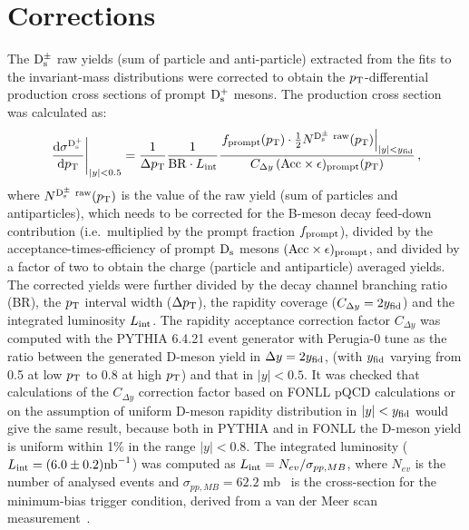 \section{Corrections}
\label{sec:corrPP}
The ${\rm D_s^{\pm}}$ raw yields (sum of particle and anti-particle) extracted from the fits to the invariant-mass distributions
were corrected to obtain the $p_{\rm T}$-differential production cross sections of prompt
 ${\rm D_s^+}$ mesons. The production cross section was calculated as:
\begin{equation}
  \label{eq:dsdptPP}
  \left.\frac{{\rm d} \sigma^{\rm D^{+}_{\rm s}}}{{\rm d}p_{\rm T}}\right|_{|y|<0.5}=
  \frac{1}{ \Delta p_{\rm T}}\frac{1}{{\rm BR} \cdot L_{\rm int}}\frac{\left.f_{\rm prompt}(p_{\rm T})\cdot \frac{1}{2} N^{\rm D^\pm_{\rm s}~raw}(p_{\rm T})\right|_{|y|<y_{\rm fid}}}{ C_{\Delta y} \,({\rm Acc}\times\epsilon)_{\rm prompt}(p_{\rm T})}\,,
\end{equation}
where $N^{\rm D^\pm_{\rm s}~raw}(p_{\rm T})$ is the value of the raw yield 
(sum of particles and antiparticles),
 which needs to be corrected for the B-meson decay feed-down contribution 
(i.e.\ multiplied by the prompt fraction $f_{\rm{prompt}}$), divided by the 
acceptance-times-efficiency of prompt ${\rm D_s}$ mesons 
$(\rm Acc \times \epsilon)_{\rm{prompt}}$, and divided by a factor of two to 
obtain the charge (particle and antiparticle) averaged yields.
The corrected yields were further divided by the decay channel branching ratio (BR), 
the $p_{\rm T}$ interval width ($\Delta p_{\rm T}$), the rapidity coverage 
($C_{\Delta y} = 2 y_{\rm fid}$) and the integrated luminosity $L_{\rm int}$.
The rapidity acceptance correction factor $C_{\Delta y}$ was computed with the PYTHIA 6.4.21 event generator
with Perugia-0 tune as the ratio between the generated D-meson yield in $\Delta y = 2y_{\rm fid}$, 
(with $y_{\rm fid}$ varying from 0.5 at low $p_{\rm T}$ to 0.8 at high $p_{\rm T}$) 
and that in $|y| < 0.5$. It was checked that calculations of the $C_{\Delta y}$ correction 
factor based on FONLL pQCD calculations or on the assumption of uniform D-meson
rapidity distribution in $|y| < y_{\rm fid}$ would give the same result, 
because both in PYTHIA and in FONLL the D-meson yield is uniform within 1\% in the range $|y| < 0.8$.
The integrated luminosity ($L_{\rm int} = (6.0 \pm 0.2) {\rm nb}^{-1}$) was computed as $L_{\rm int} = N_{ev}/\sigma_{pp,MB}$,
where $N_{ev}$ is the number of analysed events and 
$\sigma_{pp,MB} = 62.2$ mb~\cite{Abelev:2012sea}
is the cross-section for the minimum-bias trigger condition, derived from
a van der Meer scan measurement~\cite{vanderMeer:296752}.

